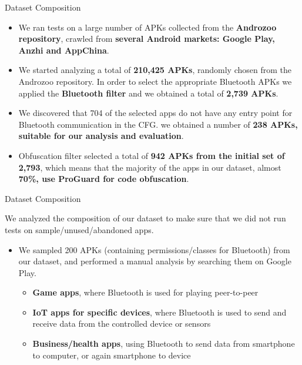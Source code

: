 \documentclass[10pt]{beamer}
\begin{document}
\begin{frame}[fragile]{Dataset Composition}
 
  \begin{itemize}

  \item We ran tests on a large number of APKs collected from the
    {\bf Androzoo repository}, crawled from {\bf several Android markets:
      Google Play, Anzhi and AppChina}.

  \item We started analyzing a total of {\bf 210,425 APKs}, randomly
    chosen from the Androzoo repository. In order to select the
    appropriate Bluetooth APKs we applied the {\bf Bluetooth filter}
    and we obtained a total of {\bf 2,739 APKs}.
 
  \item We discovered that 704 of the selected apps do not have any
    entry point for Bluetooth communication in the CFG. we obtained a
    number of {\bf 238 APKs, suitable for our analysis and
      evaluation}.

    \item Obfuscation filter selected a total of {\bf 942 APKs from the
      initial set of 2,793}, which means that the majority of the apps
    in our dataset, almost {\bf 70\%, use ProGuard for code
      obfuscation}.

    


  \end{itemize}

  
\end{frame}

\begin{frame}[fragile]{Dataset Composition}

  We analyzed the composition of our dataset to make sure that we did
  not run tests on sample/unused/abandoned apps.
  
  \begin{itemize}
    
  \item We sampled 200 APKs (containing permissions/classes for
    Bluetooth) from our dataset, and performed a manual analysis by
    searching them on Google Play.
    \begin{itemize}

    \item {\bf Game apps}, where Bluetooth is used for playing peer-to-peer

    \item {\bf IoT apps for specific devices}, where Bluetooth is used
      to send and receive data from the controlled device or sensors

    \item {\bf Business/health apps}, using Bluetooth to send data
      from smartphone to computer, or again smartphone to device
    
  \end{itemize}

  \end{itemize}
  
\end{frame}
\end{document}

